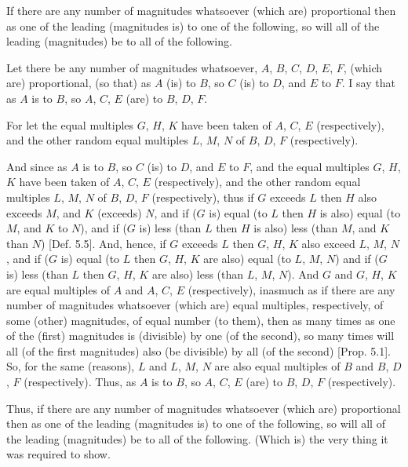 \begin{Parallel}{}{}
{If there are any number  of magnitudes whatsoever
(which are) proportional then as one of the leading (magnitudes is) to one of the following, so
will 
all of the leading (magnitudes) be to all of the following.

\epsfysize=1.3in
\centerline{}

Let there be any number of magnitudes whatsoever, 
$A$, $B$, $C$, $D$, $E$, $F$, (which are) proportional, (so that) as $A$ (is) to $B$, so $C$ (is) to $D$, and 
$E$ to $F$. I say that as $A$ is to $B$, so  $A$, $C$, $E$ (are) to  $B$, $D$, $F$.

For let the equal multiples $G$, $H$,  $K$ have been taken of $A$, $C$, $E$
(respectively), and the other random equal multiples $L$, $M$,  $N$ of
$B$, $D$, $F$ (respectively).

And since as $A$ is to $B$, so $C$ (is) to $D$, and $E$ to $F$, and the equal multiples
$G$, $H$, $K$ have been taken of $A$, $C$,  $E$ (respectively), and the other
random equal multiples $L$, $M$,  $N$ of $B$, $D$,  $F$ (respectively), thus
if $G$ exceeds $L$ then $H$ also exceeds $M$, and $K$ (exceeds) $N$, and if ($G$ is)
equal (to $L$ then $H$ is also) equal (to $M$, and $K$  to $N$), and if ($G$ is) less (than $L$ then $H$ is also) less (than $M$, and $K$  than $N$)  [Def. 5.5].  And, hence, if $G$ exceeds $L$ then
$G$, $H$, $K$ also exceed $L$, $M$, $N$, and if ($G$ is) equal
(to $L$ then $G$, $H$, $K$ are also) equal (to  $L$, $M$, $N$) and if ($G$ is) less (than $L$ then
$G$, $H$, $K$ are also) less (than $L$, $M$, $N$). And $G$ and $G$, $H$, $K$ are equal multiples
of $A$ and $A$, $C$, $E$ (respectively), inasmuch as if there are any number of magnitudes whatsoever (which are)  equal multiples, respectively, of
some  (other) magnitudes,  of equal  number (to them), then as many times as one of the (first) magnitudes is (divisible) by one (of the second), so many times
will all (of the first magnitudes) also (be divisible) by all (of the second)
 [Prop. 5.1]. So, for the same (reasons), $L$
 and $L$, $M$, $N$ are also equal multiples of $B$ and $B$, $D$, $F$ (respectively). Thus,
 as $A$ is to $B$, so $A$, $C$, $E$ (are) to $B$, $D$, $F$ (respectively).
 
Thus, if there are any number  of magnitudes whatsoever
(which are) proportional then as one of the leading (magnitudes is) to one of the following, so
will 
all of the leading (magnitudes) be to all of the following. (Which is) the
very thing it was required to show.}
\end{Parallel}



